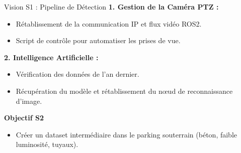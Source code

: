\documentclass[aspectratio=169]{beamer}
\begin{document}
\begin{frame}{Vision S1 : Pipeline de Détection}
    \textbf{1. Gestion de la Caméra PTZ :}
    \begin{itemize}
        \item Rétablissement de la communication IP et flux vidéo ROS2.
        \item Script de contrôle pour automatiser les prises de vue.
    \end{itemize}

    \vspace{0.3cm}

    \textbf{2. Intelligence Artificielle :}
    \begin{itemize}
        \item Vérification des données de l'an dernier.
        \item Récupération du modèle et rétablissement du nœud de reconnaissance d'image.
    \end{itemize}
    
    \textbf{Objectif S2}
        \begin{itemize}
            \item Créer un dataset intermédiaire dans le parking souterrain (béton, faible luminosité, tuyaux).
        \end{itemize}
    
\end{frame}
\end{document}

